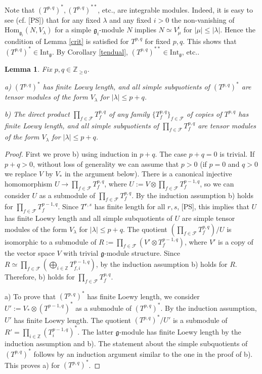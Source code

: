 \documentclass{birkmult}
\newcounter{theorem}
\newtheorem{lemma}[theo]{Lemma}
\newcommand {\ZZ} {\mathbb {Z}}
\renewcommand{\gg}{\mathfrak{g}}
\newcommand{\refle}[1]{Lemma \ref{#1}}
\newcommand{\ds}{\displaystyle}
\newcommand{\Int}{\mathrm{Int}}
\renewcommand{\hom}{\mathrm{Hom}}
\begin{document}
Note that $(T^{p,q})^*,(T^{p,q})^{**}$, etc., are integrable
modules. Indeed, it is easy to see (cf. [PS]) that for any fixed
$\lambda$ and any fixed $i>0$ the non-vanishing of $\hom_{\gg_i}(N,V_\lambda)$
for a simple $\gg_i$-module $N$ implies
$N\simeq V_\mu^i$ for $|\mu|\leq|\lambda|$. Hence the condition of
\refle{crit} is satisfied for $T^{p,q}$ for fixed $p,q$. This
shows that $(T^{p,q})^*\in\Int_\gg$. By Corollary \ref{tendual},
 $(T^{p,q})^{**}\in\Int_\gg$, etc..
\begin{lemma}\label{tp} Fix $p,q\in\ZZ_{\geq 0}$.

a) $(T^{p,q})^*$ has finite Loewy length, and all simple
subquotients of $(T^{p,q})^*$ are tensor modules of the form
$V_\lambda$ for $|\lambda|\leq p+q$. 

b) The direct product $\ds\prod_{f\in\mathcal F} T^{p,q}_f$ of any
family $\{T^{p,q}_f\}_{f\in\mathcal F}$ of copies of $T^{p,q}$ has
finite Loewy length, and all simple subquotients of
$\ds\prod_{f\in\mathcal F} T^{p,q}_f$ are tensor modules  of the form
$V_\lambda$ for $|\lambda|\leq p+q$.
\end{lemma}
\begin{proof} First we prove b) using induction in $p+q$. The case $p+q=0$ is trivial.
If $p+q>0$, without loss of generality we can assume that $p>0$
(if $p=0$ and $q>0$ we replace $V$ by $V_*$ in the argument
below). There is a canonical injective homomorphism $\ds
U\to\prod_{f\in\mathcal F} T^{p,q}_f$, where $\ds U:=V\otimes
\prod_{f\in\mathcal F} T^{p-1,q}_f$, so we can consider $U$ as a
submodule of $\ds\prod_{f\in\mathcal F} T^{p,q}_f$. By the
induction assumption b) holds for $\ds\prod_{f\in\mathcal F}T^{p-1,q}_f$. 
 Since
$T^{r,s}$ has finite length for all $r,s$, [PS], this implies that 
$U$ has finite Loewy length and all simple subquotients of $U$ are
simple tensor modules  of the form
$V_\lambda$ for $|\lambda|\leq p+q$. The quotient $\ds(\prod_{f\in\mathcal F}
T^{p,q}_f)/U$ is isomorphic to a submodule of $\ds
R:=\prod_{f\in\mathcal F} (V'\otimes T^{p-1,q}_f)$, where $V'$ is
a copy of the vector space $V$ with trivial $\gg$-module
structure. Since $\ds R\simeq \prod_{f\in\mathcal F}(\bigoplus_{i\in\ZZ}T^{p-1,q}_{f,i})$, 
by the induction assumption b)
holds for  $R$. Therefore, b) holds for
$\ds\prod_{f\in\mathcal F} T_f^{p,q}$.

a) To prove that $(T^{p,q})^*$ has finite Loewy length, we consider
$U':=V_*\otimes (T^{p-1,q})^*$ as a submodule of $(T^{p,q})^*$. By
the induction assumption, $U'$ has finite Loewy length. The
quotient $(T^{p,q})^*/U'$ is a submodule of
$R'=\ds\prod_{i\in\ZZ}(T^{p-1,q}_i)^*$. The latter $\gg$-module
has finite Loewy length by the induction assumption and b). The
statement about the simple subquotients of $(T^{p,q})^*$ 
follows by an induction argument similar to the one in the
proof of b). This proves a)
for $(T^{p,q})^*$.
\end{proof}
\end{document}
